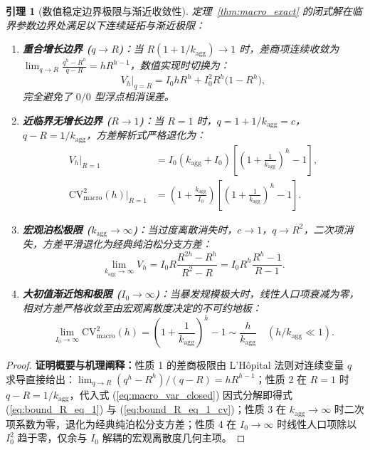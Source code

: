 \documentclass[10pt,a4paper]{article}
\theoremstyle{plain}
\newtheorem{lemma}{引理}
\theoremstyle{definition}
\begin{document}
\begin{lemma}[数值稳定边界极限与渐近收敛性]\label{lem:macro_boundaries}
定理~\ref{thm:macro_exact} 的闭式解在临界参数边界处满足以下连续延拓与渐近极限：
\begin{enumerate}
\item \textbf{重合增长边界 ($q \to R$)}：当 $R(1 + 1/k_{\text{agg}}) \to 1$ 时，差商项连续收敛为 $\lim_{q\to R} \frac{q^h - R^h}{q - R} = h R^{h-1}$，数值实现时切换为：
\begin{equation}
V_h \Big|_{q=R} = I_0 h R^h + I_0^2 R^h \bigl(1 - R^h\bigr), \label{eq:bound_q_eq_R}
\end{equation}
完全避免了 $0/0$ 型浮点相消误差。
\item \textbf{近临界无增长边界 ($R \to 1$)}：当 $R = 1$ 时，$q = 1 + 1/k_{\text{agg}} = c$，$q - R = 1/k_{\text{agg}}$，方差解析式严格退化为：
\begin{align}
V_h \Big|_{R=1} &= I_0 (k_{\text{agg}} + I_0) \left[ \left(1 + \frac{1}{k_{\text{agg}}}\right)^h - 1 \right], \label{eq:bound_R_eq_1} \\
\text{CV}^2_{\text{macro}}(h) \Big|_{R=1} &= \left(1 + \frac{k_{\text{agg}}}{I_0}\right) \left[ \left(1 + \frac{1}{k_{\text{agg}}}\right)^h - 1 \right]. \label{eq:bound_R_eq_1_cv}
\end{align}
\item \textbf{宏观泊松极限 ($k_{\text{agg}} \to \infty$)}：当过度离散消失时，$c \to 1$，$q \to R^2$，二次项消失，方差平滑退化为经典纯泊松分支方差：
\begin{equation}
\lim_{k_{\text{agg}}\to\infty} V_h = I_0 R \frac{R^{2h} - R^h}{R^2 - R} = I_0 R^h \frac{R^h - 1}{R - 1}.
\end{equation}
\item \textbf{大初值渐近饱和极限 ($I_0 \to \infty$)}：当暴发规模极大时，线性人口项衰减为零，相对方差严格收敛至由宏观离散度决定的不可约地板：
\begin{equation}
\lim_{I_0 \to \infty} \text{CV}^2_{\text{macro}}(h) = \left(1 + \frac{1}{k_{\text{agg}}}\right)^h - 1 \sim \frac{h}{k_{\text{agg}}} \quad (h/k_{\text{agg}} \ll 1).
\end{equation}
\end{enumerate}
\end{lemma}

\begin{proof}
\textbf{证明概要与机理阐释：}性质 1 的差商极限由 L'H\^opital 法则对连续变量 $q$ 求导直接给出：$\lim_{q\to R} (q^h-R^h)/(q-R) = h R^{h-1}$；性质 2 在 $R=1$ 时 $q-R = 1/k_{\text{agg}}$，代入式 (\ref{eq:macro_var_closed}) 因式分解即得式 (\ref{eq:bound_R_eq_1}) 与 (\ref{eq:bound_R_eq_1_cv})；性质 3 在 $k_{\text{agg}}\to\infty$ 时二次项系数为零，退化为经典纯泊松分支方差；性质 4 在 $I_0\to\infty$ 时线性人口项除以 $I_0^2$ 趋于零，仅余与 $I_0$ 解耦的宏观离散度几何主项。
\end{proof}
\end{document}
